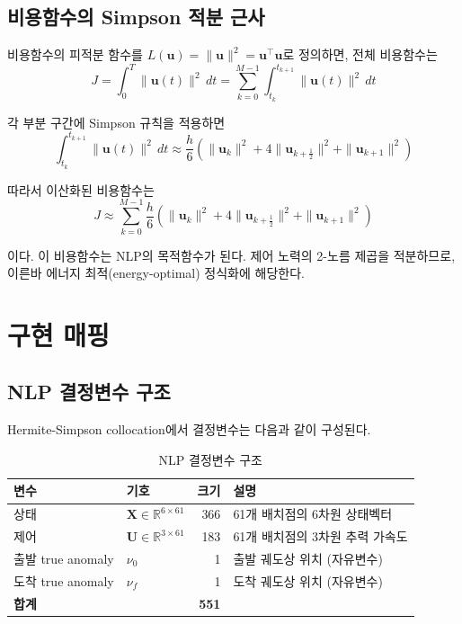 \documentclass[11pt]{article}
\begin{document}
\subsection{비용함수의 Simpson 적분 근사}
\label{sec:cost-discretization}

비용함수의 피적분 함수를 $L(\mathbf{u}) = \|\mathbf{u}\|^2 = \mathbf{u}^\top \mathbf{u}$로 정의하면, 전체 비용함수는
\[
J = \int_0^T \|\mathbf{u}(t)\|^2\, dt = \sum_{k=0}^{M-1} \int_{t_k}^{t_{k+1}} \|\mathbf{u}(t)\|^2\, dt
\]

각 부분 구간에 Simpson 규칙을 적용하면
\[
\int_{t_k}^{t_{k+1}} \|\mathbf{u}(t)\|^2\, dt \approx \frac{h}{6}\left(\|\mathbf{u}_k\|^2 + 4\|\mathbf{u}_{k+\frac{1}{2}}\|^2 + \|\mathbf{u}_{k+1}\|^2\right)
\]

따라서 이산화된 비용함수는
\begin{equation}
\label{eq:cost-discrete}
J \approx \sum_{k=0}^{M-1} \frac{h}{6}\left(\|\mathbf{u}_k\|^2 + 4\|\mathbf{u}_{k+\frac{1}{2}}\|^2 + \|\mathbf{u}_{k+1}\|^2\right)
\end{equation}

이다. 이 비용함수는 NLP의 목적함수가 된다. 제어 노력의 2-노름 제곱을 적분하므로, 이른바 에너지 최적(energy-optimal) 정식화에 해당한다.


\section{구현 매핑}
\label{sec:implementation}

\subsection{NLP 결정변수 구조}
\label{sec:nlp-variables}

Hermite-Simpson collocation에서 결정변수는 다음과 같이 구성된다.

\begin{table}[htbp]
\centering
\caption{NLP 결정변수 구조}
\label{tab:decision-variables}
\begin{tabular}{@{}llrl@{}}
\toprule
변수 & 기호 & 크기 & 설명 \\
\midrule
상태 & $\mathbf{X} \in \mathbb{R}^{6 \times 61}$ & 366 & 61개 배치점의 6차원 상태벡터 \\
제어 & $\mathbf{U} \in \mathbb{R}^{3 \times 61}$ & 183 & 61개 배치점의 3차원 추력 가속도 \\
출발 true anomaly & $\nu_0$ & 1 & 출발 궤도상 위치 (자유변수) \\
도착 true anomaly & $\nu_f$ & 1 & 도착 궤도상 위치 (자유변수) \\
\midrule
\textbf{합계} & & \textbf{551} & \\
\bottomrule
\end{tabular}
\end{table}
\end{document}
